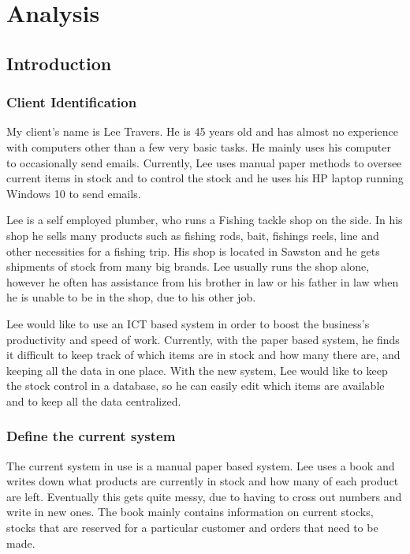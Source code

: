 \chapter{Analysis}

\section{Introduction}

\subsection{Client Identification}
My client's name is Lee Travers. He is 45 years old and has almost no experience with computers other than a few very basic tasks. He mainly uses his computer to occasionally send emails. Currently, Lee uses manual paper methods to oversee current items in stock and to control the stock and he uses his HP laptop running Windows 10 to send emails.

Lee is a self employed plumber, who runs a Fishing tackle shop on the side. In his shop he sells many products such as fishing rods, bait, fishings reels, line and other necessities for a fishing trip. His shop is located in Sawston and he gets shipments of stock from many big brands. Lee usually runs the shop alone, however he often has assistance from his brother in law or his father in law when he is unable to be in the shop, due to his other job.

Lee would like to use an ICT based system in order to boost the business's productivity and speed of work. Currently, with the paper based system, he finds it difficult to keep track of which items are in stock and how many there are, and keeping all the data in one place. With the new system, Lee would like to keep the stock control in a database, so he can easily edit which items are available and to keep all the data centralized.

\subsection{Define the current system}
The current system in use is a manual paper based system. Lee uses a book and writes down what products are currently in stock and how many of each product are left. Eventually this gets quite messy, due to having to cross out numbers and write in new ones. The book mainly contains information on current stocks, stocks that are reserved for a particular customer and orders that need to be made.

